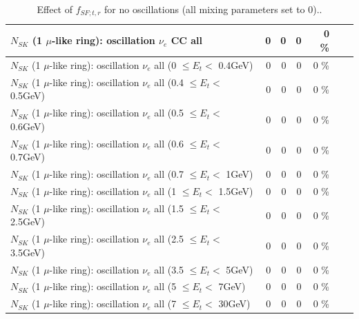 \begin{table}
\begin{tabular}{| l | r | r | r  r | r  r |}
                       $N_{SK}$ (1 $\mu$-like ring): oscillation $\nu_e$  CC all &               0 &              0 &              0 &       0 \%  & & \\
\hline
$N_{SK}$ (1 $\mu$-like ring): oscillation $\nu_{e}$ all (0 $\leq E_{t} <$ 0.4GeV) &               0 &              0 &              0 &       0 \%  & & \\
$N_{SK}$ (1 $\mu$-like ring): oscillation $\nu_{e}$ all (0.4 $\leq E_{t} <$ 0.5GeV) &               0 &              0 &              0 &       0 \%  & & \\
$N_{SK}$ (1 $\mu$-like ring): oscillation $\nu_{e}$ all (0.5 $\leq E_{t} <$ 0.6GeV) &               0 &              0 &              0 &       0 \%  & & \\
$N_{SK}$ (1 $\mu$-like ring): oscillation $\nu_{e}$ all (0.6 $\leq E_{t} <$ 0.7GeV) &               0 &              0 &              0 &       0 \%  & & \\
$N_{SK}$ (1 $\mu$-like ring): oscillation $\nu_{e}$ all (0.7 $\leq E_{t} <$ 1GeV) &               0 &              0 &              0 &       0 \%  & & \\
$N_{SK}$ (1 $\mu$-like ring): oscillation $\nu_{e}$ all (1 $\leq E_{t} <$ 1.5GeV) &               0 &              0 &              0 &       0 \%  & & \\
$N_{SK}$ (1 $\mu$-like ring): oscillation $\nu_{e}$ all (1.5 $\leq E_{t} <$ 2.5GeV) &               0 &              0 &              0 &       0 \%  & & \\
$N_{SK}$ (1 $\mu$-like ring): oscillation $\nu_{e}$ all (2.5 $\leq E_{t} <$ 3.5GeV) &               0 &              0 &              0 &       0 \%  & & \\
$N_{SK}$ (1 $\mu$-like ring): oscillation $\nu_{e}$ all (3.5 $\leq E_{t} <$ 5GeV) &               0 &              0 &              0 &       0 \%  & & \\
 $N_{SK}$ (1 $\mu$-like ring): oscillation $\nu_{e}$ all (5 $\leq E_{t} <$ 7GeV) &               0 &              0 &              0 &       0 \%  & & \\
$N_{SK}$ (1 $\mu$-like ring): oscillation $\nu_{e}$ all (7 $\leq E_{t} <$ 30GeV) &               0 &              0 &              0 &       0 \%  & & \\
\hline
\hline
\end{tabular}
\caption{ Effect of $f_{SF; t, r}$ for no oscillations (all mixing parameters set to 0).. }
\label{tab:num_xsec_sf_1RmuT_3f_osc_t13:0}
\end{table}
